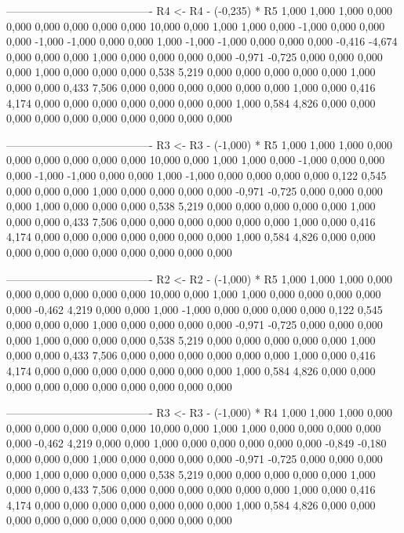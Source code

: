 \documentclass[12pt]{article}
\begin{document}
\begin{enumerate}
\begin{keluaran}
----------------------------------------
R4 <- R4 - (-0,235) * R5
1,000   1,000   1,000   0,000   0,000   0,000   0,000   0,000   0,000   10,000
0,000   1,000   1,000   0,000   -1,000  0,000   0,000   0,000   -1,000  -1,000
0,000   0,000   1,000   -1,000  -1,000  0,000   0,000   0,000   -0,416  -4,674
0,000   0,000   0,000   1,000   0,000   0,000   0,000   0,000   -0,971  -0,725
0,000   0,000   0,000   0,000   1,000   0,000   0,000   0,000   0,538   5,219
0,000   0,000   0,000   0,000   0,000   1,000   0,000   0,000   0,433   7,506
0,000   0,000   0,000   0,000   0,000   0,000   1,000   0,000   0,416   4,174
0,000   0,000   0,000   0,000   0,000   0,000   0,000   1,000   0,584   4,826
0,000   0,000   0,000   0,000   0,000   0,000   0,000   0,000   0,000   0,000

----------------------------------------
R3 <- R3 - (-1,000) * R5
1,000   1,000   1,000   0,000   0,000   0,000   0,000   0,000   0,000   10,000
0,000   1,000   1,000   0,000   -1,000  0,000   0,000   0,000   -1,000  -1,000
0,000   0,000   1,000   -1,000  0,000   0,000   0,000   0,000   0,122   0,545
0,000   0,000   0,000   1,000   0,000   0,000   0,000   0,000   -0,971  -0,725
0,000   0,000   0,000   0,000   1,000   0,000   0,000   0,000   0,538   5,219
0,000   0,000   0,000   0,000   0,000   1,000   0,000   0,000   0,433   7,506
0,000   0,000   0,000   0,000   0,000   0,000   1,000   0,000   0,416   4,174
0,000   0,000   0,000   0,000   0,000   0,000   0,000   1,000   0,584   4,826
0,000   0,000   0,000   0,000   0,000   0,000   0,000   0,000   0,000   0,000

----------------------------------------
R2 <- R2 - (-1,000) * R5
1,000   1,000   1,000   0,000   0,000   0,000   0,000   0,000   0,000   10,000
0,000   1,000   1,000   0,000   0,000   0,000   0,000   0,000   -0,462  4,219
0,000   0,000   1,000   -1,000  0,000   0,000   0,000   0,000   0,122   0,545
0,000   0,000   0,000   1,000   0,000   0,000   0,000   0,000   -0,971  -0,725
0,000   0,000   0,000   0,000   1,000   0,000   0,000   0,000   0,538   5,219
0,000   0,000   0,000   0,000   0,000   1,000   0,000   0,000   0,433   7,506
0,000   0,000   0,000   0,000   0,000   0,000   1,000   0,000   0,416   4,174
0,000   0,000   0,000   0,000   0,000   0,000   0,000   1,000   0,584   4,826
0,000   0,000   0,000   0,000   0,000   0,000   0,000   0,000   0,000   0,000

----------------------------------------
R3 <- R3 - (-1,000) * R4
1,000   1,000   1,000   0,000   0,000   0,000   0,000   0,000   0,000   10,000
0,000   1,000   1,000   0,000   0,000   0,000   0,000   0,000   -0,462  4,219
0,000   0,000   1,000   0,000   0,000   0,000   0,000   0,000   -0,849  -0,180
0,000   0,000   0,000   1,000   0,000   0,000   0,000   0,000   -0,971  -0,725
0,000   0,000   0,000   0,000   1,000   0,000   0,000   0,000   0,538   5,219
0,000   0,000   0,000   0,000   0,000   1,000   0,000   0,000   0,433   7,506
0,000   0,000   0,000   0,000   0,000   0,000   1,000   0,000   0,416   4,174
0,000   0,000   0,000   0,000   0,000   0,000   0,000   1,000   0,584   4,826
0,000   0,000   0,000   0,000   0,000   0,000   0,000   0,000   0,000   0,000


\end{keluaran}
\end{enumerate}
\end{document}
